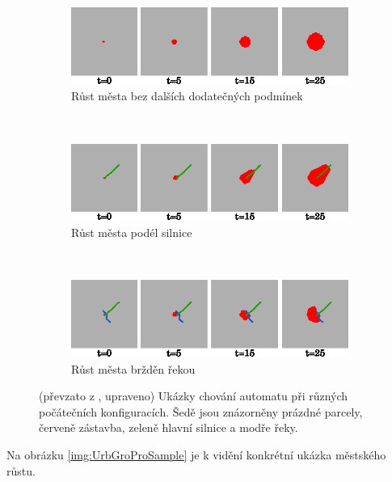 \documentclass[a4paper,10pt]{article}
\begin{document}
\begin{figure}[]
    \begin{subfigure}[t]{\textwidth} \centering
      \includegraphics[width=\textwidth]{urban-growt-transitions-1}
      \caption{Růst města bez dalších dodatečných podmínek} 
    \end{subfigure}
    \\
    \begin{subfigure}[t]{\textwidth} \centering
      \includegraphics[width=\textwidth]{urban-growt-transitions-2}
      \caption{Růst města podél silnice} 
    \end{subfigure}
    \\
    \begin{subfigure}[t]{\textwidth} \centering
      \includegraphics[width=\textwidth]{urban-growt-transitions-3}
      \caption{Růst města bržděn řekou} 
    \end{subfigure}

    \caption[Ukázky chování automatu]{(převzato z \cite{LiuPhi-DevCelAutModUrbGroIncFuzSetApp}, upraveno) Ukázky chování automatu při různých počátečních konfiguracích. Šedě jsou znázorněny prázdné parcely, červeně zástavba, zeleně hlavní silnice a modře řeky.} \label{img:VarTransRuls}
\end{figure}

Na obrázku \ref{img:UrbGroProSample} je k vidění konkrétní ukázka městského růstu.
\end{document}
